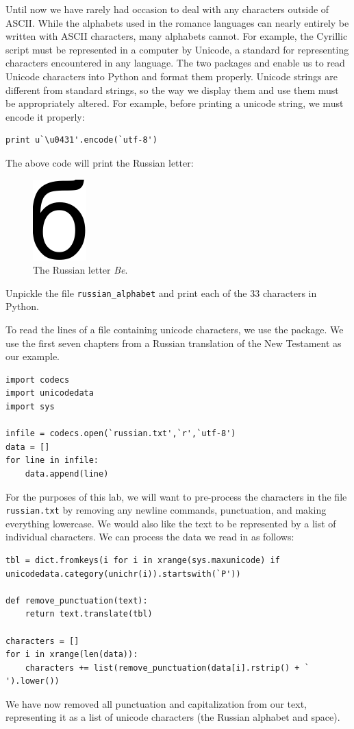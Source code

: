 
Until now we have rarely had occasion to deal with any characters outside of ASCII. While the alphabets used in the romance languages can nearly entirely be written with ASCII characters, many alphabets cannot. For example, the Cyrillic script must be represented in a computer by Unicode, a standard for representing characters encountered in any language. The two packages  and  enable us to read Unicode characters into Python and format them properly.
Unicode strings are different from standard strings, so the way we display them and use them must be appropriately altered. For example, before printing a unicode string, we must encode it properly:
\begin{lstlisting}
print u`\u0431'.encode(`utf-8')
\end{lstlisting}
The above code will print the Russian letter:
\begin{figure}[h]
\centering
\includegraphics{russianletter.pdf}
\caption{The Russian letter \emph{Be}.}
\end{figure}

\begin{problem}
Unpickle the file \texttt{russian\_alphabet} and print each of the 33 characters in Python.
\end{problem}

To read the lines of a file containing unicode characters, we use the  package. We use the first seven chapters from a Russian translation of the New Testament as our example.
\begin{lstlisting}
import codecs
import unicodedata
import sys

infile = codecs.open(`russian.txt',`r',`utf-8')
data = []
for line in infile:
	data.append(line)
\end{lstlisting}
For the purposes of this lab, we will want to pre-process the characters in the file \texttt{russian.txt} by removing any newline commands, punctuation, and making everything lowercase. We would also like the text to be represented by a list of individual characters. We can process the data we read in as follows:
\begin{lstlisting}
tbl = dict.fromkeys(i for i in xrange(sys.maxunicode) if unicodedata.category(unichr(i)).startswith(`P'))

def remove_punctuation(text):
	return text.translate(tbl)

characters = []
for i in xrange(len(data)):
	characters += list(remove_punctuation(data[i].rstrip() + ` ').lower())
\end{lstlisting}
We have now removed all punctuation and capitalization from our text, representing it as a list of unicode characters (the Russian alphabet and space).

